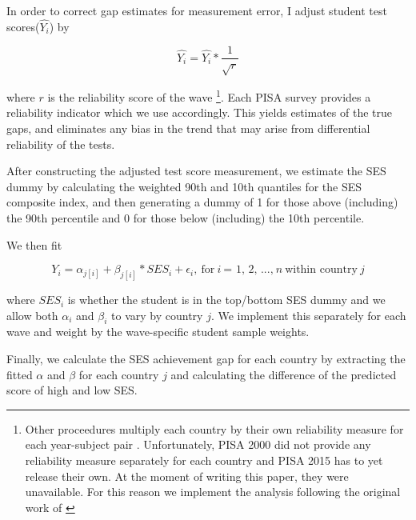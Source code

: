 \documentclass[11pt, a4paper]{article}\usepackage[]{graphicx}\usepackage[]{color}
\begin{document}
In order to correct gap estimates for measurement error, I adjust student test scores(\begin{math} \hat{Y_i} \end{math}) by

\begin{equation}
\hat{Y_i} = \hat{Y_i} * \frac{1}{\sqrt{r}}
\end{equation}

where \begin{math}r\end{math} is the reliability score of the wave \footnote{Other proceedures multiply each country by their own reliability measure for each year-subject pair \citep{anna2016_global}. Unfortunately, PISA 2000 did not provide any reliability measure separately for each country and PISA 2015 has to yet release their own. At the moment of writing this paper, they were unavailable. For this reason we implement the analysis following the original work of \citet{reardon2011}}. Each PISA survey provides a reliability indicator which we use accordingly. This yields estimates of the true gaps, and eliminates any bias in the trend that may arise from differential reliability of the tests.

After constructing the adjusted test score measurement, we estimate the SES dummy by calculating the weighted 90th and 10th quantiles for the SES composite index, and then generating a dummy of 1 for those above (including) the 90th percentile and 0 for those below (including) the 10th percentile.

We then fit

\begin{equation}
Y_i = \alpha_{j[i]} + \beta_{j[i]} * SES_i + \epsilon_i,\ \text{for} \ i \ \text{= 1, 2, ...,} \ n \ \text{within country} \ j
\end{equation}


where \(SES_i\) is whether the student is in the top/bottom SES dummy and we allow both \(\alpha_i\) and \(\beta_i\) to vary by country \(j\). We implement this separately for each wave and weight by the wave-specific student sample weights.

Finally, we calculate the SES achievement gap for each country by extracting the fitted \(\alpha\) and \(\beta\) for each country \(j\) and calculating the difference of the predicted score of high and low SES.
\end{document}
